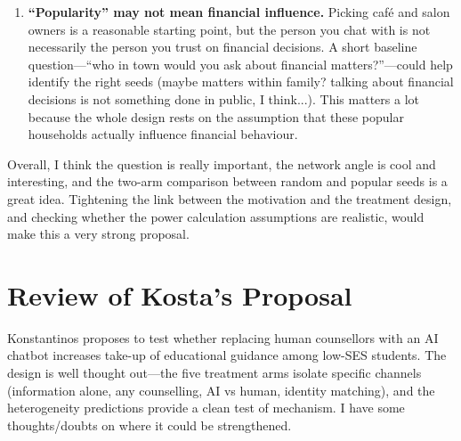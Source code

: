 \documentclass[11pt,a4paper]{article}
\begin{document}
\begin{enumerate}[leftmargin=*, itemsep=6pt]
\item \textbf{``Popularity'' may not mean financial influence.} Picking caf\'{e} and salon owners is a reasonable starting point, but the person you chat with is not necessarily the person you trust on financial decisions. A short baseline question---``who in town would you ask about financial matters?''---could help identify the right seeds (maybe matters within family? talking about financial decisions is not something done in public, I think...). This matters a lot because the whole design rests on the assumption that these popular households actually influence financial behaviour.

\end{enumerate}

\noindent Overall, I think the question is really important, the network angle is cool and interesting, and the two-arm comparison between random and popular seeds is a great idea. Tightening the link between the motivation and the treatment design, and checking whether the power calculation assumptions are realistic, would make this a very strong proposal.

\newpage

\section*{Review of Kosta's Proposal}

Konstantinos proposes to test whether replacing human counsellors with an AI chatbot increases take-up of educational guidance among low-SES students. The design is well thought out---the five treatment arms isolate specific channels (information alone, any counselling, AI vs human, identity matching), and the heterogeneity predictions provide a clean test of mechanism. I have some thoughts/doubts on where it could be strengthened.
\end{document}
